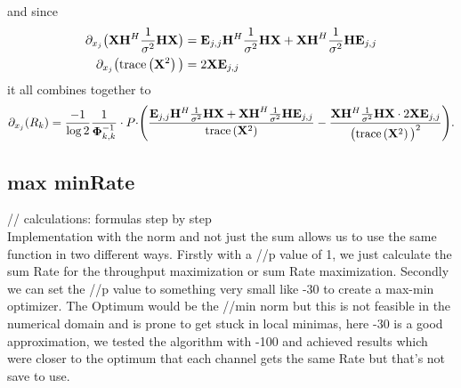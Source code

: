 and since
\begin{align}
	\partial_{x_j}\bigr(\mathbf{X}\mathbf{H}^H\frac{1}{\sigma^2}\mathbf{H}\mathbf{X}\bigl) &= \mathbf{E}_{j,j}\mathbf{H}^H\frac{1}{\sigma^2}\mathbf{HX} + \mathbf{XH}^H\frac{1}{\sigma^2}\mathbf{HE}_{j,j}\\
	\partial_{x_j}\bigr(\text{trace}\left(\mathbf{X}^2\right)\bigl) &= 2\mathbf{XE}_{j,j}
\end{align}
it all combines together to
\begin{equation}
	\partial_{x_j}(R_k) = \frac{-1}{\log{2}}\frac{1}{\mathbf{\Phi}_{k,k}^{-1}} \cdot P \cdot \Biggr(\frac{\mathbf{E}_{j,j}\mathbf{H}^H\frac{1}{\sigma^2}\mathbf{HX} + \mathbf{XH}^H\frac{1}{\sigma^2}\mathbf{HE}_{j,j}}{\text{trace}\left(\mathbf{X}^2\right)} - \frac{\mathbf{X}\mathbf{H}^H\frac{1}{\sigma^2}\mathbf{H}\mathbf{X} \cdot 2\mathbf{XE}_{j,j}}{\bigr(\text{trace}\left(\mathbf{X}^2\right)\bigl)^2}\Biggl).
\end{equation}

\subsection{max minRate}
// calculations: formulas step by step\\
Implementation with the norm and not just the sum allows us to use the same function in two different ways. Firstly with a //p value of 1, we just calculate the sum Rate for the throughput maximization or sum Rate maximization. Secondly we can set the //p value to something very small like -30 to create a max-min optimizer. The Optimum would be the //min norm but this is not feasible in the numerical domain and is prone to get stuck in local minimas, here -30 is a good approximation, we tested the algorithm with -100 and achieved results which were closer to the optimum that each channel gets the same Rate but that's not save to use.